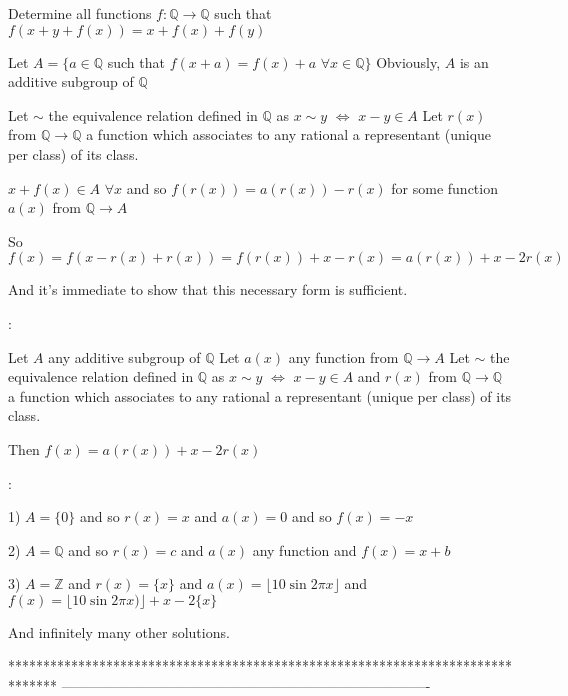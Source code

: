 \begin{solution}
	\begin{tcolorbox}Determine all functions $f : \mathbb{Q} \to \mathbb{Q}$ such that $f(x+y+f(x))= x+ f(x) +f(y)$\end{tcolorbox}
Let $A=\{a\in\mathbb Q$ such that $f(x+a)=f(x)+a$  $\forall x\in\mathbb Q\}$
Obviously, $A$ is an additive subgroup of $\mathbb Q$

Let $\sim$ the equivalence relation defined in $\mathbb Q$ as $x\sim y$ $\iff$ $x-y\in A$
Let $r(x)$ from $\mathbb Q\to\mathbb Q$ a function which associates to any rational a representant (unique per class) of its class.

$x+f(x)\in A$ $\forall x$ and so $f(r(x))=a(r(x))-r(x)$ for some function $a(x)$ from $\mathbb Q\to A$

So $f(x)=f(x-r(x)+r(x))=f(r(x))+x-r(x)=a(r(x))+x-2r(x)$

And it's immediate to show that this necessary form is sufficient.

 :

Let $A$ any additive subgroup of $\mathbb Q$
Let $a(x)$ any function from $\mathbb Q\to A$
Let $\sim$ the equivalence relation defined in $\mathbb Q$ as $x\sim y$ $\iff$ $x-y\in A$ and $r(x)$ from $\mathbb Q\to\mathbb Q$ a function which associates to any rational a representant (unique per class) of its class.

Then $f(x)=a(r(x))+x-2r(x)$

 :

1) $A=\{0\}$ and so $r(x)=x$ and $a(x)=0$ and so $\boxed{f(x)=-x}$

2) $A=\mathbb Q$ and so $r(x)=c$ and $a(x)$ any function and $\boxed{f(x)=x+b}$

3) $A=\mathbb Z$ and $r(x)=\{x\}$ and $a(x)=\lfloor 10\sin 2\pi x\rfloor$ and $\boxed{f(x)=\lfloor 10\sin 2\pi x)\rfloor+x-2\{x\}}$

And infinitely many other solutions.
\end{solution}
*******************************************************************************
-------------------------------------------------------------------------------

